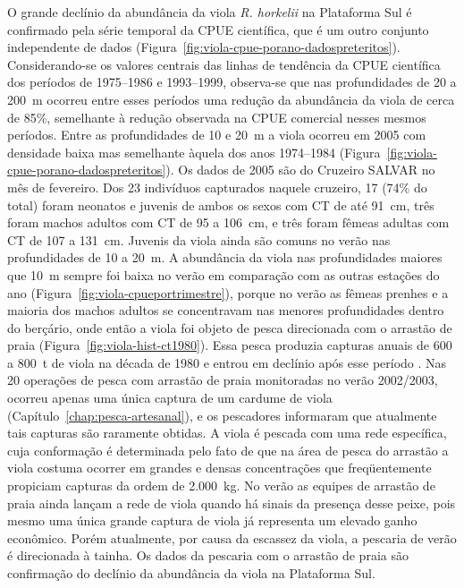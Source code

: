 \documentclass[a4paper,11pt,twoside,showtrims,onecolumn,openright,final]{memoir}
\begin{document}
O grande declínio da abundância da viola \emph{R. horkelii} na Plataforma Sul  
é confirmado pela série temporal da 
CPUE científica, que é um outro conjunto independente de dados (Figura~\ref{fig:viola-cpue-porano-dadospreteritos}). %
Considerando-se os valores centrais das linhas de tendência da CPUE científica 
dos períodos de 1975--1986 e 1993--1999, observa-se que nas profundidades de 20 a 200~m 
ocorreu entre esses períodos uma redução da abundância da viola de cerca de 85\%, semelhante 
à redução observada na CPUE comercial nesses mesmos períodos. Entre as profundidades de 10 e 20~m 
a viola ocorreu em 2005 com densidade baixa mas semelhante àquela 
dos anos 1974--1984 (Figura~\ref{fig:viola-cpue-porano-dadospreteritos}). 
Os dados de 2005 são do Cruzeiro SALVAR no mês de fevereiro. Dos 23 indivíduos capturados naquele 
cruzeiro, 17 (74\% do total) foram neonatos e juvenis de ambos os sexos com CT de até 91~cm, 
três foram machos adultos com CT de 95 a 106~cm, e três foram fêmeas adultas com CT de 107 a 131~cm. 
Juvenis da viola ainda são comuns no verão nas profundidades de 10 a 20~m. A abundância da viola 
nas profundidades maiores que 10~m sempre foi baixa no verão em comparação com as outras 
estações do ano (Figura~\ref{fig:viola-cpueportrimestre}),  %
porque no verão as fêmeas prenhes e a maioria dos machos adultos 
se concentravam nas menores profundidades dentro do berçário, onde então a viola foi objeto de 
pesca direcionada com o arrastão de praia (Figura~\ref{fig:viola-hist-ct1980}). 
Essa pesca produzia capturas anuais de 600 a 800~t de viola na década de 1980
e entrou em declínio após esse período \citep{lessa1982,miranda2003}. %
Nas 20 operações de pesca  com arrastão de praia monitoradas no verão 2002/2003, ocorreu 
apenas uma única captura de um cardume de viola (Capítulo~\ref{chap:pesca-artesanal}), %
e os pescadores informaram que atualmente tais capturas são raramente obtidas.
A viola é pescada com uma rede específica, cuja 
conformação é determinada pelo fato de que na área de pesca do arrastão a viola costuma 
ocorrer em grandes e densas concentrações que freqüentemente propiciam capturas da 
ordem de 2.000~kg. No verão as equipes de arrastão de praia ainda lançam a rede de viola 
quando há sinais da presença desse peixe, pois mesmo uma única grande captura de viola já 
representa um elevado ganho econômico. Porém atualmente, por causa da escassez da viola, 
a pescaria de verão é  direcionada à tainha. Os dados da pescaria com o arrastão de praia 
são confirmação do declínio da abundância da viola na Plataforma Sul. 
\end{document}
